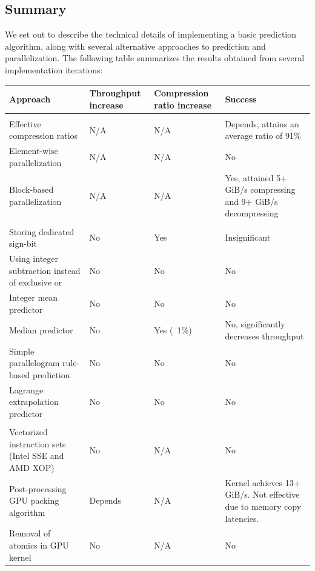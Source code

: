   \subsection{Summary}
  We set out to describe the technical details of implementing a basic prediction algorithm, along with several alternative approaches to prediction and parallelization. The following
  table summarizes the results obtained from several implementation iterations:
  \begin{tabular}{|p{}|p{}|p{}|p{}|}
   \hline
   \rowcolor[gray]{0.70}\textbf{Approach} & \textbf{Throughput increase} & \textbf{Compression ratio increase} & \textbf{Success}\\
   \hline
   \rowcolor[gray]{0.80}\multicolumn{4}{|l|}{\textbf{Basic compression and parallelization:}}\\
   \hline
   Effective compression ratios & N/A & N/A & Depends, attains an average ratio of 91\% \\
   \hline
   Element-wise parallelization & N/A & N/A & No \\
   \hline
   Block-based parallelization & N/A & N/A & Yes, attained 5+ GiB/s compressing and 9+ GiB/s decompressing \\
   \hline
   \rowcolor[gray]{0.80}\multicolumn{4}{|l|}{\textbf{Alternative predictors:}}\\
   \hline
   Storing dedicated sign-bit & No & Yes & Insignificant \\
   \hline
   Using integer subtraction instead of exclusive or & No & No & No\\
   \hline
   Integer mean predictor & No & No & No\\
   \hline
   Median predictor & No & Yes (~1\%) & No, significantly decreases throughput\\
   \hline
   Simple parallelogram rule-based prediction & No & No & No\\
   \hline
   Lagrange extrapolation predictor & No & No & No\\
   \hline
   \rowcolor[gray]{0.80}\multicolumn{4}{|l|}{\textbf{Advanced parallelization techniques}}\\
   \hline
   Vectorized instruction sets (Intel SSE and AMD XOP) & No & N/A & No\\
   \hline
   Post-processing GPU packing algorithm & Depends & N/A & Kernel achieves 13+ GiB/s. Not effective due to memory copy latencies.\\
   \hline
   Removal of atomics in GPU kernel & No & N/A & No\\
   \hline
  \end{tabular}

